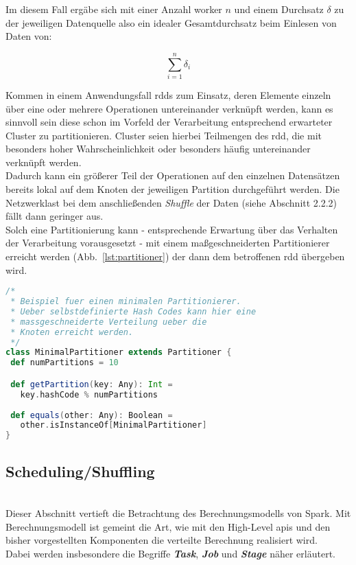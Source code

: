 Im diesem Fall ergäbe sich mit einer Anzahl \gls{worker} $n$ und einem Durchsatz $\delta$ zu der jeweiligen Datenquelle also ein idealer Gesamtdurchsatz beim Einlesen von Daten von:

\begin{equation}
	\sum_{i=1}^{n} \delta_i
\end{equation}

Kommen in einem Anwendungsfall \gls{rdd}s zum Einsatz, deren Elemente einzeln über eine oder mehrere Operationen untereinander verknüpft werden, kann es sinnvoll sein diese schon im Vorfeld der Verarbeitung entsprechend erwarteter Cluster zu partitionieren. Cluster seien hierbei Teilmengen des \gls{rdd}, die mit besonders hoher Wahrscheinlichkeit oder besonders häufig untereinander verknüpft werden.\\

Dadurch kann ein größerer Teil der Operationen auf den einzelnen Datensätzen bereits lokal auf dem Knoten der jeweiligen Partition durchgeführt werden. Die Netzwerklast bei dem anschließenden \textit{Shuffle} der Daten (siehe Abschnitt 2.2.2) fällt dann geringer aus.\\

Solch eine Partitionierung kann - entsprechende Erwartung über das Verhalten der Verarbeitung vorausgesetzt - mit einem maßgeschneiderten Partitionierer erreicht werden (Abb.~\ref{lst:partitioner}) der dann dem betroffenen \gls{rdd} übergeben wird.\\

\begin{lstlisting}[language=Scala,caption={Beispiel: Minimaler Partitionierer},label={lst:partitioner}]
/*
 * Beispiel fuer einen minimalen Partitionierer. 
 * Ueber selbstdefinierte Hash Codes kann hier eine 
 * massgeschneiderte Verteilung ueber die 
 * Knoten erreicht werden.
 */
class MinimalPartitioner extends Partitioner {
 def numPartitions = 10

 def getPartition(key: Any): Int =
   key.hashCode % numPartitions
	
 def equals(other: Any): Boolean =
   other.isInstanceOf[MinimalPartitioner]
}
\end{lstlisting}

\subsection{Scheduling/Shuffling}\\

Dieser Abschnitt vertieft die Betrachtung des Berechnungsmodells von Spark. Mit Berechnungsmodell ist gemeint die Art, wie mit den High-Level \glspl{api} und den bisher vorgestellten Komponenten die verteilte Berechnung realisiert wird.\\
Dabei werden insbesondere die Begriffe \textit{\textbf{Task}}, \textit{\textbf{Job}} und \textit{\textbf{Stage}} näher erläutert.\\

